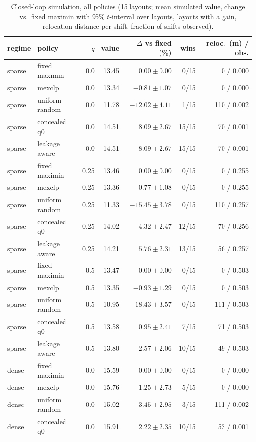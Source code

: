 \begin{table}[h]\centering\caption{Closed-loop simulation, all policies (15 layouts; mean simulated value, change vs.\ fixed maximin with 95\% $t$-interval over layouts, layouts with a gain, relocation distance per shift, fraction of shifts observed).}\label{tab:s-sim}\scriptsize
\begin{tabular}{@{}llrrrrr@{}}\toprule regime & policy & $q$ & value & $\Delta$ vs fixed (\%) & wins & reloc.\ (m) / obs.\\\midrule
sparse & fixed maximin & 0.0 & 13.45 & $0.00\pm0.00$ & 0/15 & 0 / 0.000\\
sparse & mexclp & 0.0 & 13.34 & $-0.81\pm1.07$ & 0/15 & 0 / 0.000\\
sparse & uniform random & 0.0 & 11.78 & $-12.02\pm4.11$ & 1/15 & 110 / 0.002\\
sparse & concealed q0 & 0.0 & 14.51 & $8.09\pm2.67$ & 15/15 & 70 / 0.001\\
sparse & leakage aware & 0.0 & 14.51 & $8.09\pm2.67$ & 15/15 & 70 / 0.001\\
sparse & fixed maximin & 0.25 & 13.46 & $0.00\pm0.00$ & 0/15 & 0 / 0.255\\
sparse & mexclp & 0.25 & 13.36 & $-0.77\pm1.08$ & 0/15 & 0 / 0.255\\
sparse & uniform random & 0.25 & 11.33 & $-15.45\pm3.78$ & 0/15 & 110 / 0.257\\
sparse & concealed q0 & 0.25 & 14.02 & $4.32\pm2.47$ & 12/15 & 70 / 0.256\\
sparse & leakage aware & 0.25 & 14.21 & $5.76\pm2.31$ & 13/15 & 56 / 0.257\\
sparse & fixed maximin & 0.5 & 13.47 & $0.00\pm0.00$ & 0/15 & 0 / 0.503\\
sparse & mexclp & 0.5 & 13.35 & $-0.93\pm1.29$ & 0/15 & 0 / 0.503\\
sparse & uniform random & 0.5 & 10.95 & $-18.43\pm3.57$ & 0/15 & 111 / 0.503\\
sparse & concealed q0 & 0.5 & 13.58 & $0.95\pm2.41$ & 7/15 & 71 / 0.503\\
sparse & leakage aware & 0.5 & 13.80 & $2.57\pm2.06$ & 10/15 & 49 / 0.503\\
dense & fixed maximin & 0.0 & 15.59 & $0.00\pm0.00$ & 0/15 & 0 / 0.000\\
dense & mexclp & 0.0 & 15.76 & $1.25\pm2.73$ & 5/15 & 0 / 0.000\\
dense & uniform random & 0.0 & 15.02 & $-3.45\pm2.95$ & 3/15 & 111 / 0.002\\
dense & concealed q0 & 0.0 & 15.91 & $2.22\pm2.35$ & 10/15 & 53 / 0.001\\

\end{tabular}
\end{table}
